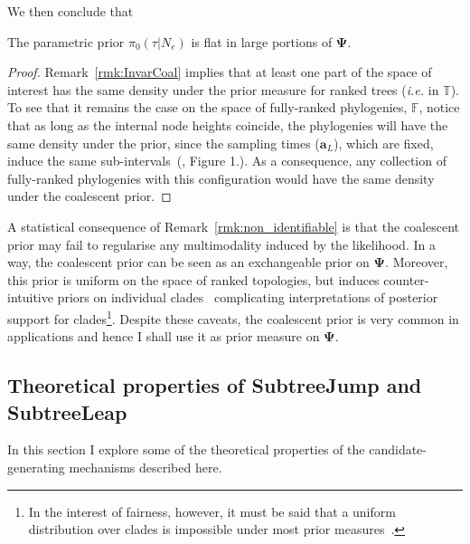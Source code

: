 We then conclude that
\begin{remark}
\label{rmk:non_identifiable}
  The parametric prior $\pi_0(\tau| N_e)$ is flat in large portions of $\boldsymbol\Psi$.
\end{remark}
\begin{proof}
Remark~\ref{rmk:InvarCoal} implies that at least one part of the space of interest has the same density under the prior measure for ranked trees (\textit{i.e.} in $\mathbb{T}$).
To see that it remains the case on the space of fully-ranked phylogenies, $\mathbb{F}$, notice that as long as the internal node heights coincide, the phylogenies will have the same density under the prior, since the sampling times ($\boldsymbol a_L$), which are fixed, induce the same sub-intervals~(\cite{Minin2008}, Figure 1.).
As a consequence, any collection of fully-ranked phylogenies with this configuration would have the same density under the coalescent prior. 
\end{proof}

A statistical consequence of Remark~\ref{rmk:non_identifiable} is that the coalescent prior may fail to regularise any multimodality induced by the likelihood.
In a way, the coalescent prior can be seen as an exchangeable prior on $\boldsymbol \Psi$.
Moreover, this prior is uniform on the space of ranked topologies, but induces counter-intuitive priors on individual clades~\citep{Pickett2005} complicating interpretations of posterior support for clades\footnote{In the interest of fairness, however, it must be said that a uniform distribution over clades is impossible under most prior measures~\citep{Steel2006}.}.
Despite these caveats, the coalescent prior is very common in applications and hence I shall use it as prior measure on $\boldsymbol \Psi$.

\subsection{Theoretical properties of SubtreeJump and SubtreeLeap}
\label{sec:stx_properties}

In this section I explore some of the theoretical properties of the candidate-generating mechanisms described here.

